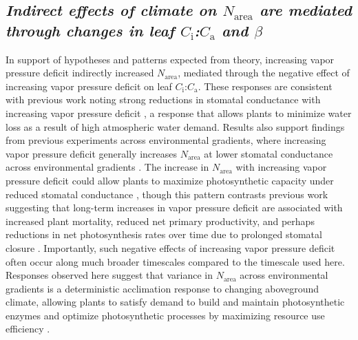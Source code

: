 \begin{singlespace}
\subsection{\textit{Indirect effects of climate on $N_\mathrm{area}$ are mediated through changes in leaf $C_\mathrm{i}$:$C_\mathrm{a}$ and $\beta$}}
\end{singlespace}
\noindent In support of hypotheses and patterns expected from theory, increasing vapor pressure deficit indirectly increased $N_\mathrm{area}$, mediated through the negative effect of increasing vapor pressure deficit on leaf $C_\mathrm{i}$:$C_\mathrm{a}$. These responses are consistent with previous work noting strong reductions in stomatal conductance with increasing vapor pressure deficit , a response that allows plants to minimize water loss as a result of high atmospheric water demand. Results also support findings from previous experiments across environmental gradients, where increasing vapor pressure deficit generally increases $N_\mathrm{area}$ at lower stomatal conductance across environmental gradients . The increase in $N_\mathrm{area}$ with increasing vapor pressure deficit could allow plants to maximize photosynthetic capacity under reduced stomatal conductance , though this pattern contrasts previous work suggesting that long-term increases in vapor pressure deficit are associated with increased plant mortality, reduced net primary productivity, and perhaps reductions in net photosynthesis rates over time due to prolonged stomatal closure . Importantly, such negative effects of increasing vapor pressure deficit often occur along much broader timescales compared to the timescale used here.  Responses observed here suggest that variance in $N_\mathrm{area}$ across environmental gradients is a deterministic acclimation response to changing aboveground climate, allowing plants to satisfy demand to build and maintain photosynthetic enzymes and optimize photosynthetic processes by maximizing resource use efficiency .


